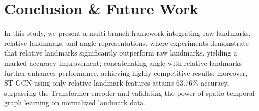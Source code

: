 \documentclass[journal,onecolumn, 11pt]{IEEEtran}
\begin{document}







\section{Conclusion \& Future Work}



In this study, we present a multi-branch framework integrating raw landmarks, relative landmarks, and angle representations, where experiments demonstrate that relative landmarks significantly outperform raw landmarks, yielding a marked accuracy improvement; concatenating angle with relative landmarks further enhances performance, achieving highly competitive results; moreover, ST-GCN using only relative landmark features attains 63.76\% accuracy, surpassing the Transformer encoder and validating the power of spatio-temporal graph learning on normalized landmark data.
\end{document}
